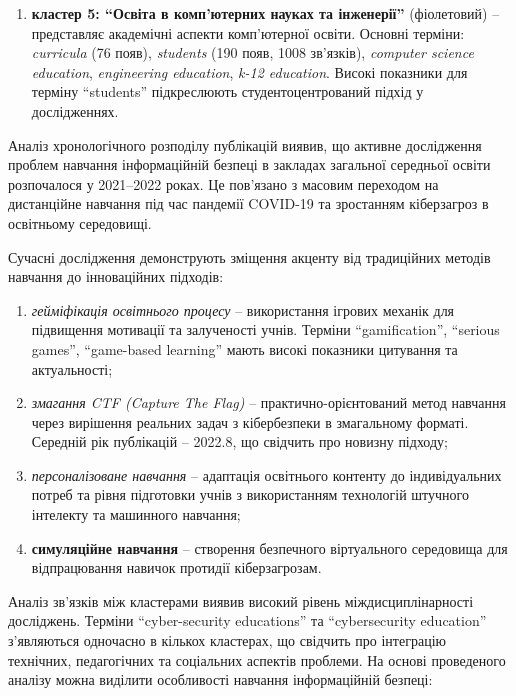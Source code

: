 \begin{enumerate}[label=--]
\item 
\textbf{кластер 5: ``Освіта в комп'ютерних науках та інженерії''} (фіолетовий) -- представляє академічні аспекти комп'ютерної освіти. Основні терміни: \textit{curricula} (76 появ), \textit{students} (190 появ, 1008 зв'язків), \textit{computer science education}, \textit{engineering education}, \textit{k-12 education}. Високі показники для терміну ``students'' підкреслюють студентоцентрований підхід у дослідженнях.
\end{enumerate}

Аналіз хронологічного розподілу публікацій виявив, що активне дослідження проблем навчання інформаційній безпеці в закладах загальної середньої освіти розпочалося у 2021--2022 роках. Це пов'язано з масовим переходом на дистанційне навчання під час пандемії COVID-19 та зростанням кіберзагроз в освітньому середовищі.


Сучасні дослідження демонструють зміщення акценту від традиційних методів навчання до інноваційних підходів:

\begin{enumerate}[label=--] %
    \item \textit{гейміфікація освітнього процесу} -- використання ігрових механік для підвищення мотивації та залученості учнів. Терміни ``gamification'', ``serious games'', ``game-based learning'' мають високі показники цитування та актуальності;
    
    \item \textit{змагання CTF (Capture The Flag)} -- практично-орієнтований метод навчання через вирішення реальних задач з кібербезпеки в змагальному форматі. Середній рік публікацій -- 2022.8, що свідчить про новизну підходу;
    
    \item \textit{персоналізоване навчання} -- адаптація освітнього контенту до індивідуальних потреб та рівня підготовки учнів з використанням технологій штучного інтелекту та машинного навчання;
    
    \item \textbf{симуляційне навчання} -- створення безпечного віртуального середовища для відпрацювання навичок протидії кіберзагрозам.
\end{enumerate}


Аналіз зв'язків між кластерами виявив високий рівень міждисциплінарності досліджень. Терміни ``cyber-security educations'' та ``cybersecurity education'' з'являються одночасно в кількох кластерах, що свідчить про інтеграцію технічних, педагогічних та соціальних аспектів проблеми.
На основі проведеного аналізу можна виділити особливості навчання інформаційній безпеці:

